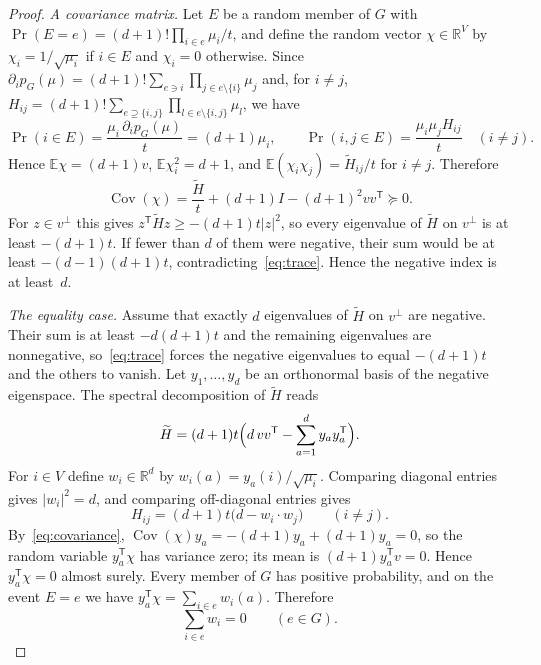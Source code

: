 \documentclass[11pt]{article}
\theoremstyle{definition}
\numberwithin{equation}{section}
\newcommand{\R}{\mathbb R}
\DeclareMathOperator{\Cov}{Cov}
\begin{document}
\begin{proof}
\emph{A covariance matrix.} Let $E$ be a random member of $G$ with $\Pr(E=e)=(d+1)!\prod_{i\in e}\mu_i/t$, and define the random vector $\chi\in\R^V$ by $\chi_i=1/\sqrt{\mu_i}$ if $i\in E$ and $\chi_i=0$ otherwise. Since $\partial_ip_G(\mu)=(d+1)!\sum_{e\ni i}\prod_{j\in e\setminus\{i\}}\mu_j$ and, for $i\ne j$, $H_{ij}=(d+1)!\sum_{e\supseteq\{i,j\}}\prod_{l\in e\setminus\{i,j\}}\mu_l$, we have
\begin{equation*}
 \Pr(i\in E)=\frac{\mu_i\,\partial_ip_G(\mu)}t=(d+1)\mu_i,\qquad
 \Pr(i,j\in E)=\frac{\mu_i\mu_jH_{ij}}t\quad(i\ne j).
\end{equation*}
Hence $\mathbb E\chi=(d+1)v$, $\mathbb E\chi_i^2=d+1$, and $\mathbb E(\chi_i\chi_j)=\widetilde H_{ij}/t$ for $i\ne j$. Therefore
\begin{equation}\label{eq:covariance}
 \Cov(\chi)=\frac{\widetilde H}t+(d+1)I-(d+1)^2vv^{\mathsf T}\succeq0.
\end{equation}
For $z\in v^\perp$ this gives $z^{\mathsf T}\widetilde Hz\ge-(d+1)t|z|^2$, so every eigenvalue of $\widetilde H$ on $v^\perp$ is at least $-(d+1)t$. If fewer than $d$ of them were negative, their sum would be at least $-(d-1)(d+1)t$, contradicting~\eqref{eq:trace}. Hence the negative index is at least~$d$.

\emph{The equality case.} Assume that exactly $d$ eigenvalues of $\widetilde H$ on $v^\perp$ are negative. Their sum is at least $-d(d+1)t$ and the remaining eigenvalues are nonnegative, so~\eqref{eq:trace} forces the negative eigenvalues to equal $-(d+1)t$ and the others to vanish. Let $y_1,\ldots,y_d$ be an orthonormal basis of the negative eigenspace. The spectral decomposition of $\widetilde H$ reads
\begin{equation*}
 \widetilde H=(d+1)t\Bigl(d\,vv^{\mathsf T}-\sum_{a=1}^dy_ay_a^{\mathsf T}\Bigr).
\end{equation*}
For $i\in V$ define $w_i\in\R^d$ by $w_i(a)=y_a(i)/\sqrt{\mu_i}$. Comparing diagonal entries gives $|w_i|^2=d$, and comparing off-diagonal entries gives
\begin{equation}\label{eq:pairhess}
 H_{ij}=(d+1)t\bigl(d-w_i\cdot w_j\bigr)\qquad(i\ne j).
\end{equation}
By~\eqref{eq:covariance}, $\Cov(\chi)y_a=-(d+1)y_a+(d+1)y_a=0$, so the random variable $y_a^{\mathsf T}\chi$ has variance zero; its mean is $(d+1)y_a^{\mathsf T}v=0$. Hence $y_a^{\mathsf T}\chi=0$ almost surely. Every member of $G$ has positive probability, and on the event $E=e$ we have $y_a^{\mathsf T}\chi=\sum_{i\in e}w_i(a)$. Therefore
\begin{equation}\label{eq:zerosum}
 \sum_{i\in e}w_i=0\qquad(e\in G).
\end{equation}


\end{proof}
\end{document}
